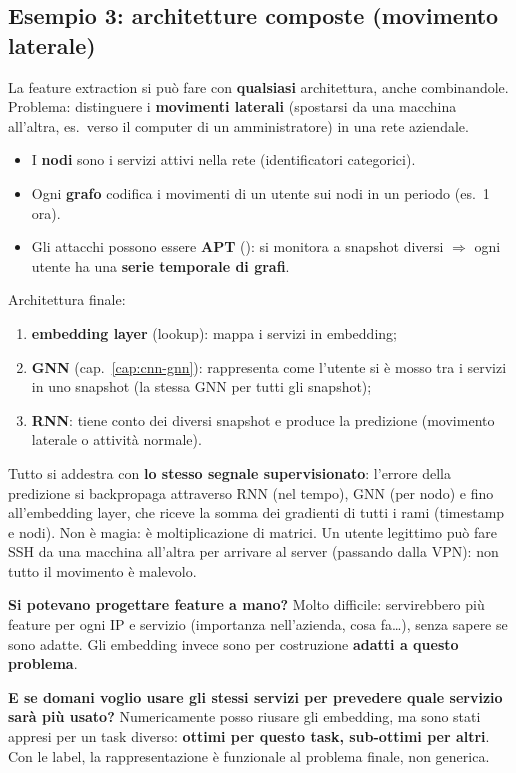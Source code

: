 \subsection{Esempio 3: architetture composte (movimento laterale)}
La feature extraction si può fare con \textbf{qualsiasi} architettura, anche combinandole. Problema: distinguere i \textbf{movimenti laterali}
(spostarsi da una macchina all'altra, es.\ verso il computer di un amministratore) in una rete aziendale.
\begin{itemize}
  \item I \textbf{nodi} sono i servizi attivi nella rete (identificatori categorici).
  \item Ogni \textbf{grafo} codifica i movimenti di un utente sui nodi in un periodo (es.\ 1 ora).
  \item Gli attacchi possono essere \textbf{APT} (): si monitora a snapshot diversi $\Rightarrow$ ogni utente ha una
        \textbf{serie temporale di grafi}.
\end{itemize}
Architettura finale:
\begin{enumerate}
  \item \textbf{embedding layer} (lookup): mappa i servizi in embedding;
  \item \textbf{GNN} (cap.~\ref{cap:cnn-gnn}): rappresenta come l'utente si è mosso tra i servizi in uno snapshot (la stessa GNN per tutti gli snapshot);
  \item \textbf{RNN}: tiene conto dei diversi snapshot e produce la predizione (movimento laterale o attività normale).
\end{enumerate}
Tutto si addestra con \textbf{lo stesso segnale supervisionato}: l'errore della predizione si backpropaga attraverso RNN (nel tempo), GNN (per
nodo) e fino all'embedding layer, che riceve la somma dei gradienti di tutti i rami (timestamp e nodi). Non è magia: è moltiplicazione di matrici.
Un utente legittimo può fare SSH da una macchina all'altra per arrivare al server (passando dalla VPN): non tutto il movimento è malevolo.

\begin{esame}
\textbf{Si potevano progettare feature a mano?} Molto difficile: servirebbero più feature per ogni IP e servizio (importanza nell'azienda, cosa
fa\ldots), senza sapere se sono adatte. Gli embedding invece sono per costruzione \textbf{adatti a questo problema}.

\textbf{E se domani voglio usare gli stessi servizi per prevedere quale servizio sarà più usato?} Numericamente posso riusare gli embedding, ma
sono stati appresi per un task diverso: \textbf{ottimi per questo task, sub-ottimi per altri}. Con le label, la rappresentazione è funzionale al
problema finale, non generica.
\end{esame}

